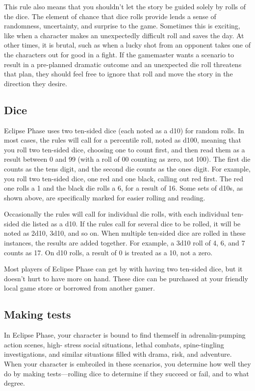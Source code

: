 This rule also means that you shouldn't let the story be guided solely by rolls of the dice. The element of chance that dice rolls provide lends a sense of randomness, uncertainty, and surprise to the game. Sometimes this is exciting, like when a character makes an unexpectedly difficult roll and saves the day. At other times, it is brutal, such as when a lucky shot from an opponent takes one of the characters out for good in a fight. If the gamemaster wants a scenario to result in a pre-planned dramatic outcome and an unexpected die roll threatens that plan, they should feel free to ignore that roll and move the story in the direction they desire. 

\subsection{Dice} \label{sec:dice-1} 

Eclipse Phase uses two ten-sided dice (each noted as a d10) for random rolls. In most cases, the rules will call for a percentile roll, noted as d100, meaning that you roll two ten-sided dice, choosing one to count first, and then read them as a result between 0 and 99 (with a roll of 00 counting as zero, not 100). The first die counts as the tens digit, and the second die counts as the ones digit. For example, you roll two ten-sided dice, one red and one black, calling out red first. The red one rolls a 1 and the black die rolls a 6, for a result of 16. Some sets of d10s, as shown above, are specifically marked for easier rolling and reading. 

Occasionally the rules will call for individual die rolls, with each individual ten-sided die listed as a d10. If the rules call for several dice to be rolled, it will be noted as 2d10, 3d10, and so on. When multiple ten-sided dice are rolled in these instances, the results are added together. For example, a 3d10 roll of 4, 6, and 7 counts as 17. On d10 rolls, a result of 0 is treated as a 10, not a zero. 

Most players of Eclipse Phase can get by with having two ten-sided dice, but it doesn't hurt to have more on hand. These dice can be purchased at your friendly local game store or borrowed from another gamer. 

\subsection{Making tests} \label{sec:making-tests} 

In Eclipse Phase, your character is bound to find themself in adrenalin-pumping action scenes, high- stress social situations, lethal combats, spine-tingling investigations, and similar situations filled with drama, risk, and adventure. When your character is embroiled in these scenarios, you determine how well they do by making tests—rolling dice to determine if they succeed or fail, and to what degree. 

